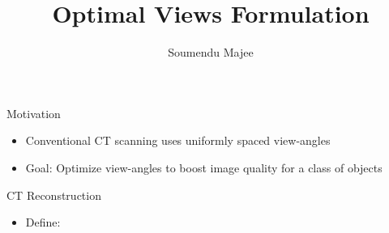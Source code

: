 \documentclass[english,aspectratio=169]{beamer}
\title{Optimal Views Formulation}
\author{Soumendu Majee}
\date{}
\begin{document}
\begin{frame}
    \titlepage
\end{frame}


\begin{frame}{Motivation}
	\begin{itemize}
	    \setlength\itemsep{2em}
		\item Conventional CT scanning uses uniformly spaced view-angles
		
		\item Goal: Optimize view-angles to boost image quality for a class of objects
		
		
	\end{itemize}
\end{frame}

\begin{frame}{CT Reconstruction}
	\begin{itemize}
	    \setlength\itemsep{2em}
		\item Define:
		
	
		
		
	\end{itemize}
\end{frame}








\end{document}
